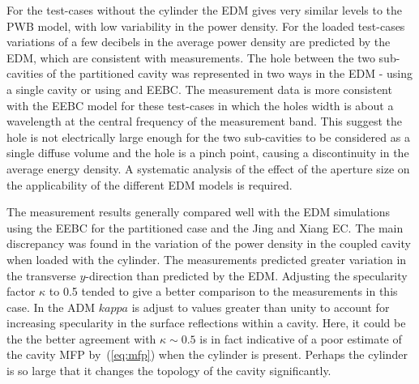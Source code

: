 \documentclass[a4paper]{article}
\numberwithin{equation}{section}
\begin{document}
For the test-cases without the cylinder the EDM gives very similar levels to the PWB model, with low
variability in the power density. For the loaded test-cases variations of a few decibels in the average
power density are predicted by the EDM, which are consistent with measurements. The hole between the
two sub-cavities of the partitioned cavity was represented in two ways in the EDM - using a single 
cavity or using and EEBC. The measurement data is more consistent with the EEBC model for these
test-cases in which the holes width is about a wavelength at the central frequency of the measurement
band. This suggest the hole is not electrically large enough for the two sub-cavities to be considered
as a single diffuse volume and the hole is a pinch point, causing a discontinuity in the average 
energy density. A systematic analysis of the effect of the aperture size on the applicability of the
different EDM models is required.

The measurement results generally compared well with the EDM simulations using the EEBC for the partitioned
case and the Jing and Xiang EC. The main discrepancy was found in the variation of the power density in the
coupled cavity when loaded with the cylinder. The measurements predicted greater variation in the transverse
$y$-direction than predicted by the EDM. Adjusting the specularity factor $\kappa$ to 0.5 tended to give a
better comparison to the measurements in this case. In the ADM $kappa$ is adjust to values greater than
unity to account for increasing specularity in the surface reflections within a cavity. Here, it could be 
the the better agreement with $\kappa\sim 0.5$ is in fact indicative of a poor estimate of the cavity
MFP by~(\ref{eq:mfp}) when the cylinder is present. Perhaps the cylinder is so large that it changes the
topology of the cavity significantly.


%

\end{document}
